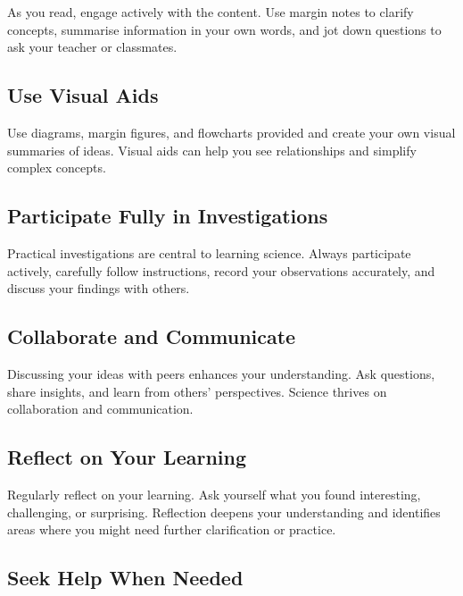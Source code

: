 As you read, engage actively with the content. Use margin notes to clarify concepts, summarise information in your own words, and jot down questions to ask your teacher or classmates.


\subsection{Use Visual Aids}

Use diagrams, margin figures, and flowcharts provided and create your own visual summaries of ideas. Visual aids can help you see relationships and simplify complex concepts.

\subsection{Participate Fully in Investigations}

Practical investigations are central to learning science. Always participate actively, carefully follow instructions, record your observations accurately, and discuss your findings with others.


\subsection{Collaborate and Communicate}

Discussing your ideas with peers enhances your understanding. Ask questions, share insights, and learn from others' perspectives. Science thrives on collaboration and communication.

\subsection{Reflect on Your Learning}

Regularly reflect on your learning. Ask yourself what you found interesting, challenging, or surprising. Reflection deepens your understanding and identifies areas where you might need further clarification or practice.

\subsection{Seek Help When Needed}

